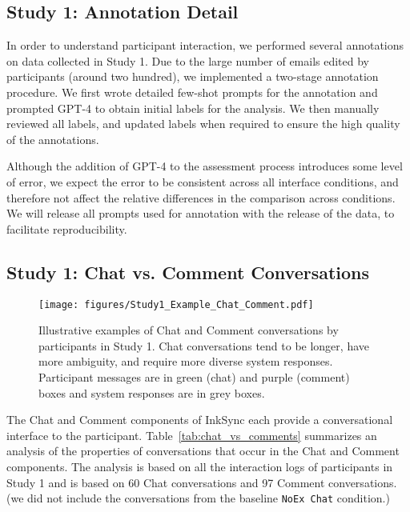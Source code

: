 \documentclass[manuscript]{acmart}
\begin{document}
\subsection{Study 1: Annotation Detail} \label{app:annotation_detail}

In order to understand participant interaction, we performed several annotations on data collected in Study 1. Due to the large number of emails edited by participants (around two hundred), we implemented a two-stage annotation procedure. We first wrote detailed few-shot prompts for the annotation and prompted GPT-4 to obtain initial labels for the analysis. We then manually reviewed all labels, and updated labels when required to ensure the high quality of the annotations.

Although the addition of GPT-4 to the assessment process introduces some level of error, we expect the error to be consistent across all interface conditions, and therefore not affect the relative differences in the comparison across conditions. We will release all prompts used for annotation with the release of the data, to facilitate reproducibility.

\subsection{Study 1: Chat vs. Comment Conversations} \label{app:chat_vs_comment}
\begin{figure}
    \centering
    \texttt{[image: figures/Study1\_Example\_Chat\_Comment.pdf]}
    \caption{Illustrative examples of Chat and Comment conversations by participants in Study 1. Chat conversations tend to be longer, have more ambiguity, and require more diverse system responses. Participant messages are in green (chat) and purple (comment) boxes and system responses are in grey boxes.}
    \label{fig:example_chat_comment}
\end{figure}



The Chat and Comment components of InkSync each provide a conversational interface to the participant. Table~\ref{tab:chat_vs_comments} summarizes an analysis of the properties of conversations that occur in the Chat and Comment components.
The analysis is based on all the interaction logs of participants in Study 1 and is based on 60 Chat conversations and 97 Comment conversations. (we did not include the conversations from the baseline \texttt{NoEx Chat} condition.)
\end{document}
